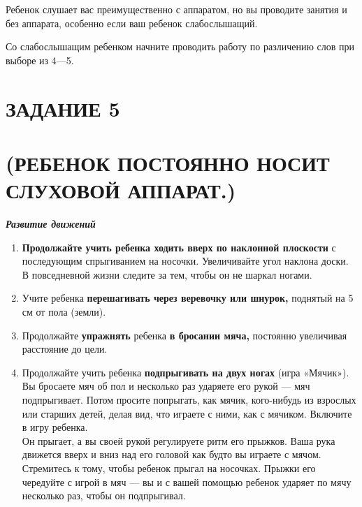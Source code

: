 \documentclass[a5paper]{book}
\renewcommand{\emph}[1]{\textit{#1}}
\begin{document}
Ребенок слушает вас преимущественно с аппаратом, но вы проводите занятия
и без аппарата, особенно если ваш ребенок слабослышащий.

Со слабослышащим ребенком начните проводить работу по различению слов
при выборе из 4---5.

\section{ЗАДАНИЕ 5}\section*{(РЕБЕНОК ПОСТОЯННО НОСИТ СЛУХОВОЙ АППАРАТ.)}

\emph{\textbf{Развитие движений}}


\begin{enumerate}
\def\labelenumi{\arabic{enumi}.}
\item
  
  \textbf{Продолжайте учить ребенка ходить вверх по наклонной плоскости}
  с последующим спрыгиванием на носочки. Увеличивайте угол наклона
  доски. В повседневной жизни следите за тем, чтобы он не шаркал ногами.
  
\item
  
  Учите ребенка \textbf{перешагивать через веревочку или шнурок,}
  поднятый на 5 см от пола (земли).
  
\item
  
  Продолжайте \textbf{упражнять} ребенка \textbf{в бросании мяча,}
  постоянно увеличивая расстояние до цели.
  
\item
  
  Продолжайте учить ребенка \textbf{подпрыгивать на двух ногах} (игра
  «Мячик»). Вы бросаете мяч об пол и несколько раз ударяете его рукой
  --- мяч подпрыгивает. Потом просите попрыгать, как мячик, кого-нибудь
  из взрослых или старших детей, делая вид, что играете с ними, как с
  мячиком. Включите в игру ребенка.\\
  Он прыгает, а вы своей рукой регулируете ритм его прыжков. Ваша рука
  движется вверх и вниз над его головой как будто вы играете с мячом.
  Стремитесь к тому, чтобы ребенок прыгал на носочках. Прыжки его
  чередуйте с игрой в мяч --- вы и с вашей помощью ребенок ударяет по
  мячу несколько раз, чтобы он подпрыгивал.
  
\end{enumerate}
\end{document}
